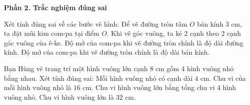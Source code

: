 \textbf{Phần 2. Trắc nghiệm đúng sai}

\begin{ex} %
Xét tính đúng sai về các bước vẽ hình:
\choiceTF
{\True Để vẽ đường tròn tâm $O$ bán kính $3\text{ cm}$, ta đặt mũi kim com-pa tại điểm $O$.}
{\True Khi vẽ góc vuông, ta kẻ 2 cạnh theo 2 cạnh góc vuông của ê-ke.}
{Độ mở của com-pa khi vẽ đường tròn chính là độ dài đường kính.}
{\True Độ mở của com-pa khi vẽ đường tròn chính là độ dài bán kính.}
\end{ex}

\begin{ex} %
Bạn Hùng vẽ trang trí một hình vuông lớn cạnh $8\text{ cm}$ gồm 4 hình vuông nhỏ bằng nhau. Xét tính đúng sai:
\choiceTF
{\True Mỗi hình vuông nhỏ có cạnh dài $4\text{ cm}$.}
{\True Chu vi của mỗi hình vuông nhỏ là $16\text{ cm}$.}
{Chu vi hình vuông lớn bằng tổng chu vi 4 hình vuông nhỏ.}
{\True Chu vi hình vuông lớn là $32\text{ cm}$.}
\end{ex}

